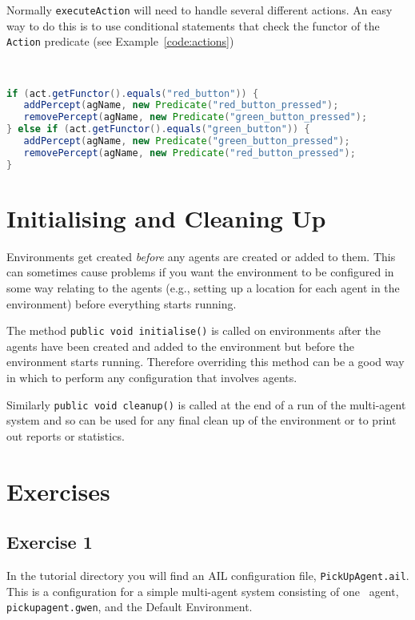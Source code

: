 Normally \texttt{executeAction} will need to handle several different actions.  An easy way to do this is to use conditional statements that check the functor of the \texttt{Action} predicate (see Example~\ref{code:actions})

\begin{ourexample}
\label{code:actions} \quad \\
\begin{lstlisting}[basicstyle=\sffamily,language=Java,style=easslisting]
if (act.getFunctor().equals("red_button")) {
   addPercept(agName, new Predicate("red_button_pressed");
   removePercept(agName, new Predicate("green_button_pressed");
} else if (act.getFunctor().equals("green_button")) {
   addPercept(agName, new Predicate("green_button_pressed");
   removePercept(agName, new Predicate("red_button_pressed");
}
\end{lstlisting}
\end{ourexample}

\section{Initialising and Cleaning Up}
Environments get created \emph{before} any agents are created or added to them.  This can sometimes cause problems if you want the environment to be configured in some way relating to the agents (e.g., setting up a location for each agent in the environment) before everything starts running.

The method \texttt{public void initialise()} is called on environments after the agents have been created and added to the environment but before the environment starts running.  Therefore overriding this method can be a good way in which to perform any configuration that involves agents.

Similarly \texttt{public void cleanup()} is called at the end of a run of the multi-agent system and so can be used for any final clean up of the environment or to print out reports or statistics.

\section{Exercises}

\subsection{Exercise 1}
In the tutorial directory you will find an AIL configuration file, \texttt{PickUpAgent.ail}.  This is a configuration for a simple multi-agent system consisting of one \gwendolen\ agent, \texttt{pickupagent.gwen}, and the Default Environment.

